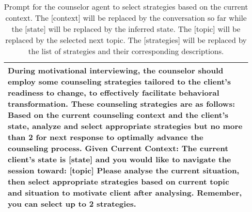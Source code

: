 \begin{table*}[tb]
\begin{tabularx}{\textwidth}{X}
\toprule
{\sf \footnotesize During motivational interviewing, the counselor should employ some counseling strategies tailored to the client's readiness to change, to effectively facilitate behavioral transformation. These counseling strategies are as follows: \newline \newline [strategies] \newline  Based on the current counseling context and the client's state, analyze and select appropriate strategies but no more than 2 for next response to optimally advance the counseling process.  \newline \newline Given Current Context: \newline [context] \newline The current client's state is [state] and you would like to navigate the session toward: [topic] \newline \newline Please analyse the current situation, then select appropriate strategies based on current topic and situation to motivate client after analysing. Remember, you can select up to 2 strategies.}
\\ \bottomrule
\end{tabularx}
\caption{Prompt for the counselor agent to select strategies based on the current context. The [context] will be replaced by the conversation so far while the [state] will be replaced by the inferred state. The [topic] will be replaced by the selected next topic. The [strategies] will be replaced by the list of strategies and their corresponding descriptions.}
\label{tab:strategy selection}
\end{table*}


